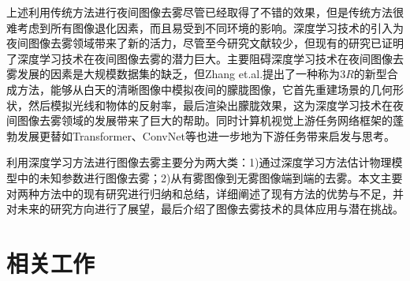 \begin{multicols}{2}
上述利用传统方法进行夜间图像去雾尽管已经取得了不错的效果，但是传统方法很难考虑到所有图像退化因素，而且易受到不同环境的影响。深度学习技术的引入为夜间图像去雾领域带来了新的活力，尽管至今研究文献较少，但现有的研究已证明了深度学习技术在夜间图像去雾的潜力巨大。主要阻碍深度学习技术在夜间图像去雾发展的因素是大规模数据集的缺乏，但Zhang et.al.提出了一种称为$3R$的新型合成方法，能够从白天的清晰图像中模拟夜间的朦胧图像，它首先重建场景的几何形状，然后模拟光线和物体的反射率，最后渲染出朦胧效果，这为深度学习技术在夜间图像去雾领域的发展带来了巨大的帮助。同时计算机视觉上游任务网络框架的蓬勃发展更替如Transformer、ConvNet等也进一步地为下游任务带来启发与思考。

利用深度学习方法进行图像去雾主要分为两大类：1)通过深度学习方法估计物理模型中的未知参数进行图像去雾；2)从有雾图像到无雾图像端到端的去雾。本文主要对两种方法中的现有研究进行归纳和总结，详细阐述了现有方法的优势与不足，并对未来的研究方向进行了展望，最后介绍了图像去雾技术的具体应用与潜在挑战。


%
%

%
\section{相关工作}

\end{multicols}
